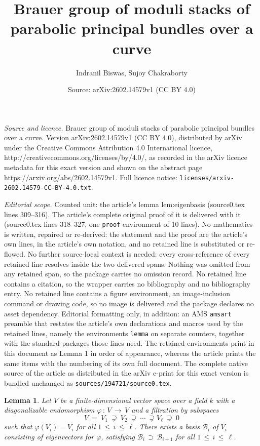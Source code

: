 \documentclass[10pt,a4paper]{amsart}
\title{Brauer group of moduli stacks of parabolic principal bundles over a curve}
\author{Indranil Biswas, Sujoy Chakraborty}
\date{Source: arXiv:2602.14579v1 (CC BY 4.0)}
\newtheorem{lemma}{Lemma}
\newcommand{\mc}[1]{\mathcal{#1}}
\begin{document}
\maketitle

\noindent\emph{Source and licence.} Brauer group of moduli stacks of parabolic principal bundles over a curve. Version arXiv:2602.14579v1 (CC BY 4.0), distributed by arXiv under the Creative Commons Attribution 4.0 International licence, http://creativecommons.org/licenses/by/4.0/, as recorded in the arXiv licence metadata for this exact version and shown on the abstract page https://arxiv.org/abs/2602.14579v1. Full licence notice: \texttt{licenses/arxiv-2602.14579-CC-BY-4.0.txt}.\par\smallskip

\noindent\textit{Editorial scope.} Counted unit: the article's lemma lem:eigenbasis (source0.tex lines 309--316). The article's complete original proof of it is delivered with it (source0.tex lines 318--327, one \texttt{proof} environment of 10 lines). No mathematics is written, repaired or re-derived: the statement and the proof are the article's own lines, in the article's own notation, and no retained line is substituted or re-flowed.  No further source-local context is needed: every cross-reference of every retained line resolves inside the two delivered spans.  Nothing was omitted from any retained span, so the package carries no omission record.  No retained line contains a citation, so the wrapper carries no bibliography and no bibliography entry.  No retained line contains a figure environment, an image-inclusion command or drawing code, so no image is delivered and the package declares no asset dependency.  Editorial formatting only, in addition: an AMS \texttt{amsart} preamble that restates the article's own declarations and macros used by the retained lines, namely the environments \texttt{lemma} on separate counters, together with the standard packages those lines need.  The retained environments print in this document as Lemma 1 in order of appearance, whereas the article prints the same items with the numbering of its own full document.  The complete native source of the article as distributed in the arXiv e-print for this exact version is bundled unchanged as \texttt{sources/194721/source0.tex}.
	\begin{lemma}\label{lem:eigenbasis}
		Let $V$ be a finite-dimensional vector space over a field $k$ with a diagonalizable endomorphism
		$\varphi\,:\, V\,\longrightarrow \,V$ and a filtration by subspaces
		$$V\ =\ V_1\ \supsetneq\ V_2\ \supsetneq \ \cdots\ \supsetneq V_\ell \ \supsetneq\ 0$$
		such that $\varphi(V_i) = V_i$ for all $1\, \leq\, i\, \leq\, \ell$. There exists a basis $\mc{B}_i$ of $V_i$
		consisting of eigenvectors for $\varphi$, satisfying $\mc{B}_i\,\supset\, \mc{B}_{i+1}$ for all
		$1\,\leq\, i\,\leq \,\ell$.
	\end{lemma}
\end{document}
